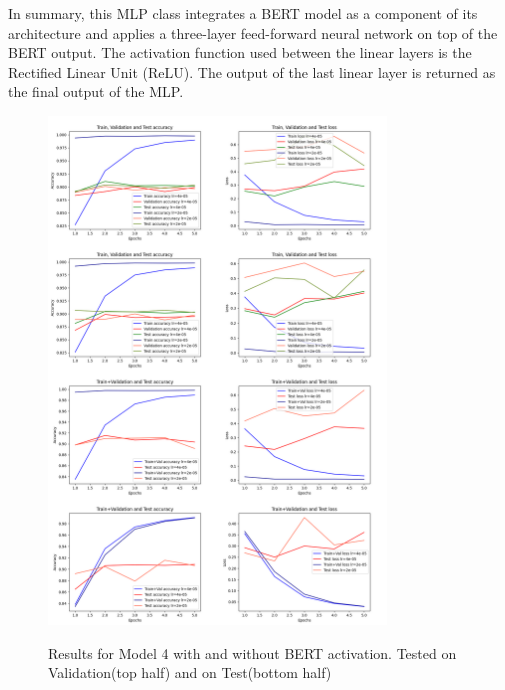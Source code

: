 In summary, this MLP class integrates a BERT model as a component of its architecture and applies a three-layer feed-forward neural network on top of the BERT output. The activation function used between the linear layers is the Rectified Linear Unit (ReLU). The output of the last linear layer is returned as the final output of the MLP.

\begin{center}
    \begin{figure}[!h]
        \centering
        \includegraphics[width=0.8\textwidth]{images/ger_model3_vertical.png}
        \label{fig:ger_model3}
        \caption{Results for Model 4 with and without BERT activation. Tested on Validation(top half) and on Test(bottom half)}
    \end{figure}
\end{center}

